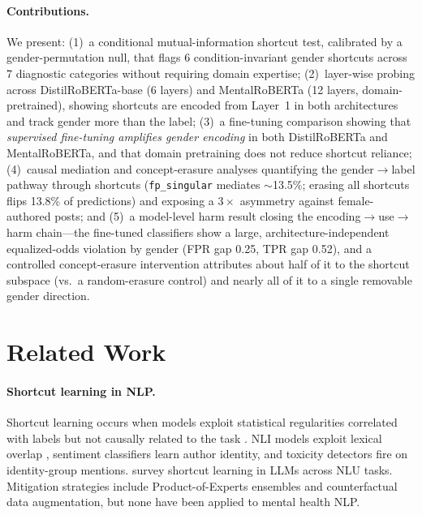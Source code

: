 \documentclass[11pt]{article}
\begin{document}
\paragraph{Contributions.}
We present:
(1)~a conditional mutual-information shortcut test, calibrated by a gender-permutation null, that flags 6 condition-invariant gender shortcuts across 7 diagnostic categories without requiring domain expertise;
(2)~layer-wise probing across DistilRoBERTa-base (6 layers) and MentalRoBERTa (12 layers, domain-pretrained), showing shortcuts are encoded from Layer~1 in both architectures and track gender more than the label;
(3)~a fine-tuning comparison showing that \emph{supervised fine-tuning amplifies gender encoding} in both DistilRoBERTa and MentalRoBERTa, and that domain pretraining does not reduce shortcut reliance;
(4)~causal mediation and concept-erasure analyses quantifying the gender$\to$label pathway through shortcuts (\texttt{fp\_singular} mediates $\sim$13.5\%; erasing all shortcuts flips 13.8\% of predictions) and exposing a $3\times$ asymmetry against female-authored posts; and
(5)~a model-level harm result closing the encoding$\to$use$\to$harm chain---the fine-tuned classifiers show a large, architecture-independent equalized-odds violation by gender (FPR gap 0.25, TPR gap 0.52), and a controlled concept-erasure intervention attributes about half of it to the shortcut subspace (vs.\ a random-erasure control) and nearly all of it to a single removable gender direction.

\section{Related Work}

\paragraph{Shortcut learning in NLP.}
Shortcut learning occurs when models exploit statistical regularities correlated with labels but not causally related to the task \citep{geirhos2020shortcut}.
NLI models exploit lexical overlap \citep{mccoy2019right}, sentiment classifiers learn author identity, and toxicity detectors fire on identity-group mentions.
\citet{du2023shortcut} survey shortcut learning in LLMs across NLU tasks.
Mitigation strategies include Product-of-Experts ensembles \citep{clark2020poe} and counterfactual data augmentation, but none have been applied to mental health NLP.
\end{document}
